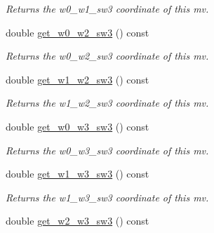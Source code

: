 \begin{DoxyCompactItemize}
\begin{DoxyCompactList}\small\item\em Returns the w0\-\_\-w1\-\_\-sw3 coordinate of this mv. \end{DoxyCompactList}\item 
\hypertarget{classe3ga_1_1mv_a76715c295903d0ac64109dd5f10a4e23}{double \hyperlink{classe3ga_1_1mv_a76715c295903d0ac64109dd5f10a4e23}{get\-\_\-w0\-\_\-w2\-\_\-sw3} () const }\label{classe3ga_1_1mv_a76715c295903d0ac64109dd5f10a4e23}

\begin{DoxyCompactList}\small\item\em Returns the w0\-\_\-w2\-\_\-sw3 coordinate of this mv. \end{DoxyCompactList}\item 
\hypertarget{classe3ga_1_1mv_ae75d4d07ffa27c4a85ff289333963145}{double \hyperlink{classe3ga_1_1mv_ae75d4d07ffa27c4a85ff289333963145}{get\-\_\-w1\-\_\-w2\-\_\-sw3} () const }\label{classe3ga_1_1mv_ae75d4d07ffa27c4a85ff289333963145}

\begin{DoxyCompactList}\small\item\em Returns the w1\-\_\-w2\-\_\-sw3 coordinate of this mv. \end{DoxyCompactList}\item 
\hypertarget{classe3ga_1_1mv_a73791e7361d1b793d067e30eacedaf1b}{double \hyperlink{classe3ga_1_1mv_a73791e7361d1b793d067e30eacedaf1b}{get\-\_\-w0\-\_\-w3\-\_\-sw3} () const }\label{classe3ga_1_1mv_a73791e7361d1b793d067e30eacedaf1b}

\begin{DoxyCompactList}\small\item\em Returns the w0\-\_\-w3\-\_\-sw3 coordinate of this mv. \end{DoxyCompactList}\item 
\hypertarget{classe3ga_1_1mv_a496c62b57c4d35cd2c495662d63a2e62}{double \hyperlink{classe3ga_1_1mv_a496c62b57c4d35cd2c495662d63a2e62}{get\-\_\-w1\-\_\-w3\-\_\-sw3} () const }\label{classe3ga_1_1mv_a496c62b57c4d35cd2c495662d63a2e62}

\begin{DoxyCompactList}\small\item\em Returns the w1\-\_\-w3\-\_\-sw3 coordinate of this mv. \end{DoxyCompactList}\item 
\hypertarget{classe3ga_1_1mv_ad2eae4263ca97af8593c32ef47bde5ea}{double \hyperlink{classe3ga_1_1mv_ad2eae4263ca97af8593c32ef47bde5ea}{get\-\_\-w2\-\_\-w3\-\_\-sw3} () const }\label{classe3ga_1_1mv_ad2eae4263ca97af8593c32ef47bde5ea}


\end{DoxyCompactItemize}
